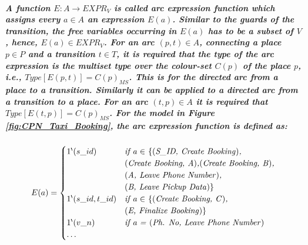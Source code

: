 \subparagraph*{\textnormal{A function $E : A \rightarrow EXPR_{V}$ is called \textbf{\textit{arc expression function}} which assigns every $a \in A$ an expression $E(a)$. Similar to the guards of the transition, the free variables occurring in $E(a)$ has to be a subset of $V$, hence, $E(a) \in EXPR_{V}$. For an arc $(p,t) \in A$, connecting a place $p \in P$ and a transition $t \in T$, it is required that the type of the arc expression is the multiset type over the colour-set $C(p)$ of the place $p$, i.e., $Type[E(p, t)] = C(p)_{MS}$. This is for the directed arc from a place to a transition. Similarly it can be applied to a directed arc from a transition to a place. For an arc $(t,p) \in A$ it is required that $Type[E(t, p)] = C(p)_{MS}$. For the model in Figure \ref{fig:CPN_Taxi_Booking}, the arc expression function is defined as:}}
\begin{equation*}
E(a) = \begin{cases}
{1}^{\backprime}(s\_id) & \textit{if a $\in$ \textnormal{\{(}S\_ID, Create Booking\textnormal{)},}\\
& \textit{\textnormal{(}Create Booking, A\textnormal{)},\textnormal{(}Create Booking, B\textnormal{)},}\\
& \textit{\textnormal{(}A, Leave Phone Number\textnormal{)},}\\ 
& \textit{\textnormal{(}B, Leave Pickup Data\textnormal{)\}}}\\
{1}^{\backprime}(s\_id,t\_id) & \textit{if a $\in$ \textnormal{\{(}Create Booking, C\textnormal{)},}\\ 
& \textit{\textnormal{(}E, Finalize Booking\textnormal{)\}}}\\
{1}^{\backprime}(v\_n) & \textit{if a = \textnormal{(}Ph. No, Leave Phone Number\textnormal{)}}\\
\ldots
\end{cases}
\end{equation*}

